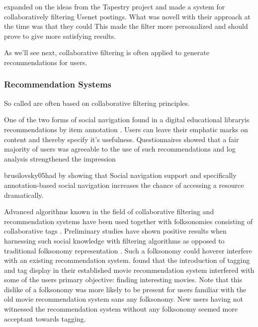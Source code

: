 \citet{resnhick94} expanded on the ideas from the Tapestry project and made
a system for collaboratively filtering Usenet postings. What was novell with
their approach at the time was that they could
This made the filter more personalized and should prove to give more
satisfying results.

%
%


As we'll see next, collaborative filtering is often applied to generate
recommendations for users.

\subsubsection{Recommendation Systems}
\label{section:background.social.navigation.applied.forms.recommendations}

So called  are often based on collaborative
filtering principles. %

One of the two forms of social navigation found in
\dash{}a digital educational
library\dash{}is recommendations by item
annotation \citep[]{brusilovsky05}. Users can leave their emphatic marks
on content and thereby specify it's usefulness. Questionnaires showed that a
fair majority of users was agreeable to the use of such recommendations
\citeyearpar[]{brusilovsky05} and log analysis strengthened
the impression
\begin{fullquote}[\p{38}]{brusilovsky05}{had by showing that}
  Social navigation support and specifically
  annotation-based social navigation increases the chance of
  accessing a resource dramatically.
\end{fullquote}

Advanced algorithms known in the field of collaborative filtering
and recommendation systems have been used together with folksonomies
consisting of collaborative tags
\citep[]{wu06}. Preliminary studies have shown positive
results when harnessing such social knowledge with filtering algorithms
as opposed to traditional folksonomy representation
\citep[]{wu06}. Such a folksonomy could hoverer interfere with an
existing recommendation system. \citet[]{sen06} found that the
introduction of tagging and tag display in their established
movie recommendation system interfered with some of the users primary
objective: finding interesting movies. Note that this dislike of a
folksonomy was more likely to be present for users familiar with the old
movie recommendation system sans any folksonomy. New users having not
witnessed the recommendation system without any folksonomy seemed more
acceptant towards tagging.

